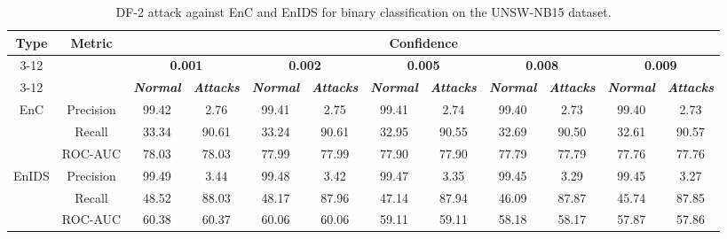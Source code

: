 \documentclass[conference]{IEEEtran}
\begin{document}
	\begin{table}[H]
		\caption{DF-2 attack against EnC and EnIDS for binary classification on the UNSW-NB15 dataset.}
		\small
		\setlength{\tabcolsep}{1pt}
		\centering
		\label{tab:unsw_bin_df}
		
		\begin{tabular}{|c|c|c|c|c|c|c|c|c|c|c|c|}
			
			\hline
			\multirow{4}{*}{\textbf{Type}} & \multirow{4}{*}{\textbf{Metric}}& \multicolumn{10}{c|}{\textbf{Confidence}} \\
			\cline{3-12}
			&  & \multicolumn{2}{c|}{\textbf{0.001}} & \multicolumn{2}{c|}{\textbf{0.002}} & \multicolumn{2}{c|}{\textbf{0.005}} & \multicolumn{2}{c|}{\textbf{0.008}} & \multicolumn{2}{c|}{\textbf{0.009}}   \\
			\cline{3-12}
			&  &  \textbf{\textsl{Normal}} & \textbf{\textsl{Attacks}} & \textbf{\textsl{Normal}} & \textbf{\textsl{Attacks}} & \textbf{\textsl{Normal}} & \textbf{\textsl{Attacks}} & \textbf{\textsl{Normal}} & \textbf{\textsl{Attacks}} & \textbf{\textsl{Normal}} & \textbf{\textsl{Attacks}} \\
			\hline
			\multirow{3}{*}{EnC} & Precision & 99.42 & 2.76 & 99.41 & 2.75 & 99.41 & 2.74 & 99.40 & 2.73 & 99.40 & 2.73 \\
			
			& Recall & 33.34 & 90.61 & 33.24 & 90.61 & 32.95 & 90.55 & 32.69 & 90.50 & 32.61 & 90.57 \\
			
			& ROC-AUC & 78.03 & 78.03 & 77.99 & 77.99 & 77.90 & 77.90 & 77.79 & 77.79 & 77.76 & 77.76 \\
			\hline
			\multirow{3}{*}{EnIDS} & Precision & \cellcolor{yellow!50}99.49 & \cellcolor{yellow!50}3.44 & \cellcolor{yellow!50}99.48 & \cellcolor{yellow!50}3.42 & \cellcolor{yellow!50}99.47 & \cellcolor{yellow!50}3.35 & \cellcolor{yellow!50}99.45 & \cellcolor{yellow!50}3.29 & \cellcolor{yellow!50}99.45 & \cellcolor{yellow!50}3.27 \\
			
			& Recall & \cellcolor{yellow!50}48.52 & 88.03 & \cellcolor{yellow!50}48.17 & 87.96 & \cellcolor{yellow!50}47.14 & 87.94 & \cellcolor{yellow!50}46.09 & 87.87 & \cellcolor{yellow!50}45.74 & 87.85 \\
			
			& ROC-AUC & 60.38 & 60.37 & 60.06 & 60.06 & 59.11 & 59.11 & 58.18 & 58.17 & 57.87 & 57.86 \\
			\hline
		\end{tabular}		
	\end{table}
	
\end{document}
